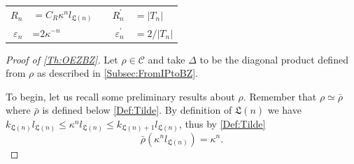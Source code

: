 \documentclass[english, 11pt, a4paper]{article}
\theoremstyle{definition}
\numberwithin{equation}{section}
\newcommand{\calC}{\mathcal{C}}
\newcommand{\BZ}{\Delta}
\newcommand{\RZ}{R^\prime}
\newcommand{\epsZ}{\varepsilon^\prime}
\newcommand{\Landing}{\mathfrak{L}}
\newcommand{\rhoaff}{\bar{\rho}}
\begin{document}
\begin{HypBox}
  \centering
  \begin{tabular}{rlcrl}
     $R_n$&$=C_R \kappa^n l_{\Landing(n)}$ & \quad & $\RZ_n$&$= \left\vert{T_n}\right\vert$  \\
    $\varepsilon_n$&=${2}{\kappa^{-n}}$ & \quad & $\epsZ_n$&$={2}/{\left\vert T_n \right\vert}$ \\
  \end{tabular}
\end{HypBox}
\begin{proof}[Proof of \cref{Th:OEZBZ}]
  Let $\rho \in \calC$
  and take $\BZ$ to be the diagonal product defined from $\rho$ as described in
  \cref{Subsec:FromIPtoBZ}.  

  To begin, let us recall some preliminary results about $\rho$.
  Remember that $\rho \simeq \rhoaff$ where $\rhoaff$ is defined below
  \cref{Def:Tilde}. By definition of $\Landing(n)$ we have 
  $k_{\Landing(n)}l_{\Landing(n)} \leq \kappa^n l_{\Landing(n)} \leq
  k_{\Landing(n)+1}l_{\Landing(n)}$, thus by \cref{Def:Tilde}
  \begin{equation}\label{eq:tilderhokappan}
   \rhoaff(\kappa^n l_{\Landing(n)}) =\kappa^n. 
  \end{equation}
  

\end{proof}
\end{document}
